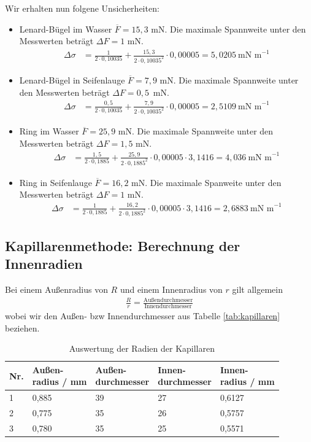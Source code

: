 \documentclass{article}
\begin{document}
Wir erhalten nun folgene Unsicherheiten:
\begin{itemize}
\item Lenard-Bügel im Wasser $\overline{F} = 15,3$ mN. Die maximale Spannweite unter den Messwerten beträgt $\Delta F = 1$ mN.
\begin{align*}
\Delta\sigma &= \frac{1}{2\cdot 0,10035} + \frac{15,3}{2\cdot  0,10035^2}\cdot 0,00005 =5,0205~\text{mN~m}^{-1}
\end{align*}
\item Lenard-Bügel in Seifenlauge $\overline{F} = 7,9$ mN. Die maximale Spannweite unter den Messwerten beträgt $\Delta F = 0,5$~mN.
\begin{align*}
\Delta\sigma &= \frac{0,5}{2\cdot 0,10035} + \frac{7,9}{2\cdot  0,10035^2}\cdot 0,00005 =2,5109~\text{mN~m}^{-1}
\end{align*}

\item Ring im Wasser $\overline{F} = 25,9$ mN. Die maximale Spannweite unter den Messwerten beträgt $\Delta F = 1,5$ mN.
\begin{align*}
\Delta\sigma &= \frac{1,5}{2\cdot 0,1885} + \frac{25,9}{2\cdot  0,1885^2}\cdot 0,00005\cdot 3,1416 = 4,036~\text{mN~m}^{-1}
\end{align*}

\item Ring in Seifenlauge $\overline{F} = 16,2$ mN. Die maximale Spanweite unter den Messwerten beträgt $\Delta F = 1$ mN.
\begin{align*}
\Delta\sigma &= \frac{1}{2\cdot 0,1885} + \frac{16,2}{2\cdot  0,1885^2}\cdot 0,00005\cdot 3,1416 = 2,6883~\text{mN~m}^{-1}
\end{align*}
\end{itemize}




\subsection{Kapillarenmethode: Berechnung der Innenradien}

Bei einem Außenradius von $R$ und einem Innenradius von $r$ gilt allgemein
\begin{align*}
\frac{R}{r} = \frac{\text{Außendurchmesser}}{\text{Innendurchmesser}}
\end{align*}
wobei wir den Außen- bzw Innendurchmesser aus Tabelle \ref{tab:kapillaren} beziehen.


\begin{table}[h]
\caption{Auswertung der Radien der Kapillaren}
\begin{tabular}{llll|l}
Nr. & \shortstack[l]{Außen-\\radius / mm} & \shortstack[l]{Außen-\\durchmesser} & \shortstack[l]{Innen-\\durchmesser} & \shortstack[l]{Innen-\\radius / mm} \\
\hline
1 & 0,885 & 39 & 27 & 0,6127 \\
2 & 0,775 & 35 & 26 & 0,5757 \\
3 & 0,780  & 35 & 25 & 0,5571
\end{tabular}
\end{table}
\end{document}
